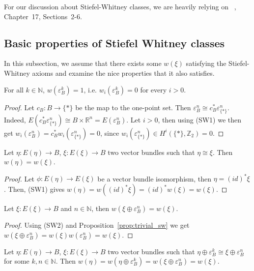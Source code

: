 For our discussion about Stiefel-Whitney classes, we are heavily relying on ~\cite{husemoller}, Chapter~17, Sections~2-6.

\subsection{Basic properties of Stiefel Whitney classes}
In this subsection, we assume that there exists some $w(\xi)$ satisfying the Stiefel-Whitney axioms and examine the nice properties that it also satisfies.
\begin{proposition}\label{prop:trivial_sw} For all $k\in\mathbb{N}$, $w(\varepsilon_B^k)=1$, i.e. $w_i(\varepsilon_B^k)=0$ for every $i>0$.
\end{proposition}
\begin{proof} Let $c_B:B\to\{*\}$ be the map to the one-point set. Then $\varepsilon_B^n\cong c_B^*\varepsilon_{\{*\}}^n$. Indeed, $E(c_B^*\varepsilon_{\{*\}}^n)\cong B\times\mathbb{R}^n=E(\varepsilon_B^n)$. Let $i>0$, then using (SW1) we then get $w_i(\varepsilon_B^n)=c_B^*w_i(\varepsilon_{\{*\}}^n)=0$, since $w_i(\varepsilon_{\{*\}}^n)\in H^i(\{*\},\mathbb{Z}_2)=0$.
\end{proof}

\begin{proposition} Let $\eta:E(\eta)\to B$, $\xi:E(\xi)\to B$ two vector bundles such that $\eta\cong\xi$. Then $w(\eta)=w(\xi)$.
\end{proposition}
\begin{proof} Let $\phi:E(\eta)\to E(\xi)$ be a vector bundle isomorphism, then $\eta=(id)^*\xi$. Then, (SW1) gives $w(\eta)=w((id)^*\xi)=(id)^*w(\xi)=w(\xi)$.
\end{proof}

\begin{proposition} Let $\xi:E(\xi)\to B$ and $n\in\mathbb{N}$, then $w(\xi\oplus\varepsilon_B^n)=w(\xi)$.
\end{proposition}
\begin{proof} Using (SW2) and Proposition~\ref{prop:trivial_sw} we get $w(\xi\oplus\varepsilon_B^n)=w(\xi)w(\varepsilon_B^n)=w(\xi)$.
\end{proof}

\begin{corollary} Let $\eta:E(\eta)\to B$, $\xi:E(\xi)\to B$ two vector bundles such that $\eta\oplus\varepsilon_B^k\cong\xi\oplus\varepsilon_B^n$ for some $k,n\in\mathbb{N}$. Then $w(\eta)=w(\eta\oplus\varepsilon_B^k)=w(\xi\oplus\varepsilon_B^n)=w(\xi)$.
\end{corollary}


